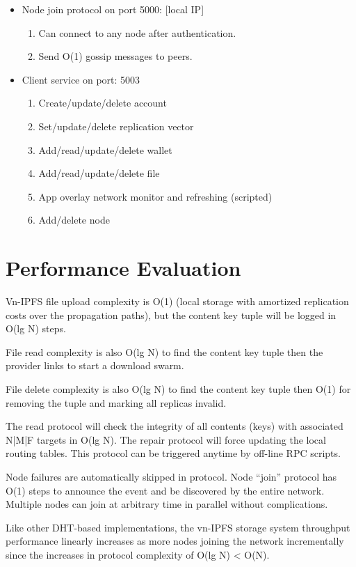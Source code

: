 \documentclass[conference]{IEEEtran}
\begin{document}
\begin{itemize}
    \item Node join protocol on port 5000: [local IP]
    \begin{enumerate}
        \item Can connect to any node after authentication.
        \item Send O(1) gossip messages to peers.
    \end{enumerate}

    \item Client service on port: 5003
    \begin{enumerate}
        \item Create/update/delete account
        \item Set/update/delete replication vector
        \item Add/read/update/delete wallet
        \item Add/read/update/delete file
        \item App overlay network monitor and refreshing (scripted)
        \item Add/delete node
    \end{enumerate}
\end{itemize}

\section{Performance Evaluation}
Vn-IPFS file upload complexity is O(1) (local storage with amortized replication costs over the propagation paths), but the content key tuple will be logged in O(lg N) steps.

File read complexity is also O(lg N) to find the content key tuple then the provider links to start a download swarm.

File delete complexity is also O(lg N) to find the content key tuple then O(1) for removing the tuple and marking all replicas invalid.

The read protocol will check the integrity of all contents (keys) with associated N|M|F targets in O(lg N). The repair protocol will force updating the local routing tables. This protocol can be triggered anytime by off-line RPC scripts.

Node failures are automatically skipped in protocol. Node “join” protocol has O(1) steps to announce the event and be discovered by the entire network. Multiple nodes can join at arbitrary time in parallel without complications.

Like other DHT-based implementations, the vn-IPFS storage system throughput performance linearly increases as more nodes joining the network incrementally since the increases in protocol complexity of O(lg N) \textless{} O(N).
\end{document}
